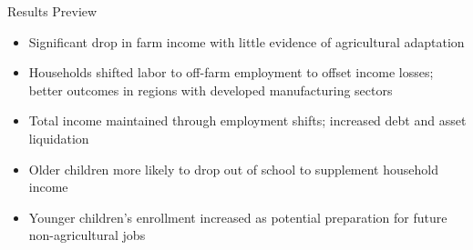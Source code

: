 \documentclass[10pt]{beamer}
\begin{document}
\begin{frame}
	{Results Preview}
	\begin{itemize}
		\item Significant drop in farm income with little evidence of agricultural adaptation
		\item Households shifted labor to off-farm employment to offset income losses; better outcomes in regions with developed manufacturing sectors
		\item Total income maintained through employment shifts; increased debt and asset liquidation
		\item Older children more likely to drop out of school to supplement household income
		\item Younger children's enrollment increased as potential preparation for future non-agricultural jobs
	\end{itemize}
\end{frame}
\end{document}
